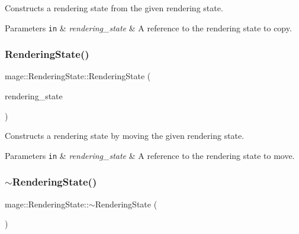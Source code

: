 Constructs a rendering state from the given rendering state.


\begin{DoxyParams}[1]{Parameters}
\mbox{\tt in}  & {\em rendering\+\_\+state} & A reference to the rendering state to copy. \\
\hline
\end{DoxyParams}
\hypertarget{structmage_1_1_rendering_state_a70c843e9c1923d4b0d855fa7a57f38bd}{}\label{structmage_1_1_rendering_state_a70c843e9c1923d4b0d855fa7a57f38bd} 
\subsubsection{\texorpdfstring{Rendering\+State()}{RenderingState()}\hspace{0.1cm}{\footnotesize\ttfamily [3/3]}}
{\footnotesize\ttfamily mage\+::\+Rendering\+State\+::\+Rendering\+State (\begin{DoxyParamCaption}\item[{\hyperlink{structmage_1_1_rendering_state}{Rendering\+State} \&\&}]{rendering\+\_\+state }\end{DoxyParamCaption})\hspace{0.3cm}{\ttfamily [default]}}

Constructs a rendering state by moving the given rendering state.


\begin{DoxyParams}[1]{Parameters}
\mbox{\tt in}  & {\em rendering\+\_\+state} & A reference to the rendering state to move. \\
\hline
\end{DoxyParams}
\hypertarget{structmage_1_1_rendering_state_aaf45726193df68d65acffbbbf699cfa3}{}\label{structmage_1_1_rendering_state_aaf45726193df68d65acffbbbf699cfa3} 
\subsubsection{\texorpdfstring{$\sim$\+Rendering\+State()}{~RenderingState()}}
{\footnotesize\ttfamily mage\+::\+Rendering\+State\+::$\sim$\+Rendering\+State (\begin{DoxyParamCaption}{ }\end{DoxyParamCaption})\hspace{0.3cm}{\ttfamily [default]}}

